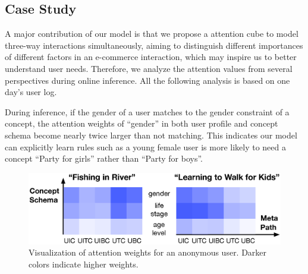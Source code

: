 \subsection{Case Study}
\label{sec:case}

A major contribution of our model is that we propose a attention cube to model three-way interactions simultaneously, aiming to distinguish different importances of different factors in an e-commerce interaction, 
which may inspire us to better understand user needs.
Therefore, we analyze the attention values from several perspectives during online inference. 
All the following analysis is based on one day's user log.



During inference, if the gender of a user matches to the gender constraint of a concept, the attention weights of ``gender'' in both user profile and concept schema become nearly twice larger than not matching.
This indicates our model can explicitly learn rules such as a young female user is more likely to need a concept ``Party for girls'' rather than ``Party for boys''.

\begin{figure}[th]
	\centering
	\includegraphics[width=\columnwidth]{figures/att_2}
	\caption{Visualization of attention weights for an anonymous user. Darker colors indicate higher weights.}
	\label{fig:att2}
\end{figure}

